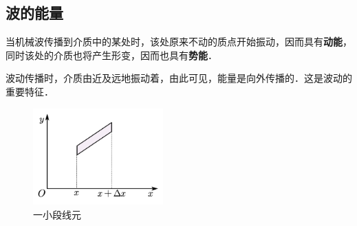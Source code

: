

\subsection{波的能量}
当机械波传播到介质中的某处时，该处原来不动的质点开始振动，因而具有\textbf{动能}，同时该处的介质也将产生形变，因而也具有\textbf{势能}．

波动传播时，介质由近及远地振动着，由此可见，能量是向外传播的．这是波动的重要特征．

\begin{figure}[ht]
\centering
\includegraphics[width=5cm]{./figures/WaEner_1.png}
\caption{一小段线元} \label{WaEner_fig1}
\end{figure}

